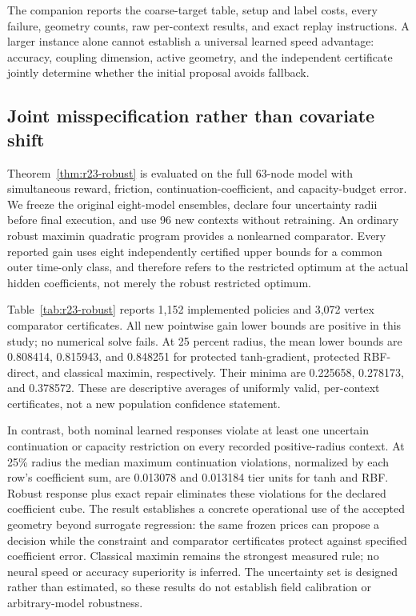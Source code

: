 \documentclass[11pt,letterpaper]{article}
\theoremstyle{definition}
\newcommand{\1}{\mathbf 1}
\begin{document}

The companion reports the coarse-target table, setup and label costs, every failure, geometry counts, raw per-context results, and exact replay instructions. A larger instance alone cannot establish a universal learned speed advantage: accuracy, coupling dimension, active geometry, and the independent certificate jointly determine whether the initial proposal avoids fallback.



\subsection{Joint misspecification rather than covariate shift}
Theorem~\ref{thm:r23-robust} is evaluated on the full 63-node model with simultaneous reward, friction, continuation-coefficient, and capacity-budget error. We freeze the original eight-model ensembles, declare four uncertainty radii before final execution, and use 96 new contexts without retraining. An ordinary robust maximin quadratic program provides a nonlearned comparator. Every reported gain uses eight independently certified upper bounds for a common outer time-only class, and therefore refers to the restricted optimum at the actual hidden coefficients, not merely the robust restricted optimum.

Table~\ref{tab:r23-robust} reports 1,152 implemented policies and 3,072 vertex comparator certificates. All new pointwise gain lower bounds are positive in this study; no numerical solve fails. At 25 percent radius, the mean lower bounds are 0.808414, 0.815943, and 0.848251 for protected tanh-gradient, protected RBF-direct, and classical maximin, respectively. Their minima are 0.225658, 0.278173, and 0.378572. These are descriptive averages of uniformly valid, per-context certificates, not a new population confidence statement.

In contrast, both nominal learned responses violate at least one uncertain continuation or capacity restriction on every recorded positive-radius context. At 25\% radius the median maximum continuation violations, normalized by each row's coefficient sum, are 0.013078 and 0.013184 tier units for tanh and RBF. Robust response plus exact repair eliminates these violations for the declared coefficient cube. The result establishes a concrete operational use of the accepted geometry beyond surrogate regression: the same frozen prices can propose a decision while the constraint and comparator certificates protect against specified coefficient error. Classical maximin remains the strongest measured rule; no neural speed or accuracy superiority is inferred. The uncertainty set is designed rather than estimated, so these results do not establish field calibration or arbitrary-model robustness.
\end{document}
